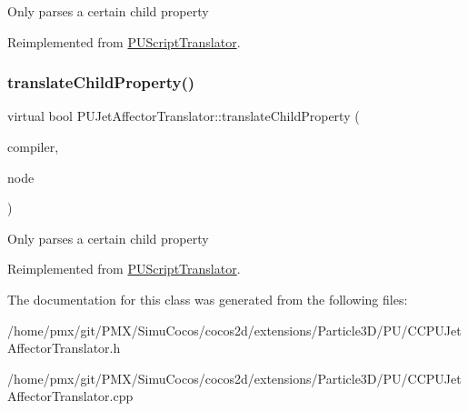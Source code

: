 Only parses a certain child property 

Reimplemented from \hyperlink{classPUScriptTranslator_a0374d83a8a04e57918975d525e0f8fe8}{P\+U\+Script\+Translator}.

\mbox{\label{classPUJetAffectorTranslator_ad9031c782a81a81d75f4dbaa01e88619}} 
\subsubsection{\texorpdfstring{translate\+Child\+Property()}{translateChildProperty()}\hspace{0.1cm}{\footnotesize\ttfamily [2/2]}}
{\footnotesize\ttfamily virtual bool P\+U\+Jet\+Affector\+Translator\+::translate\+Child\+Property (\begin{DoxyParamCaption}\item[{\hyperlink{classPUScriptCompiler}{P\+U\+Script\+Compiler} $\ast$}]{compiler,  }\item[{\hyperlink{classPUAbstractNode}{P\+U\+Abstract\+Node} $\ast$}]{node }\end{DoxyParamCaption})\hspace{0.3cm}{\ttfamily [virtual]}}

Only parses a certain child property 

Reimplemented from \hyperlink{classPUScriptTranslator_a0374d83a8a04e57918975d525e0f8fe8}{P\+U\+Script\+Translator}.



The documentation for this class was generated from the following files\+:\begin{DoxyCompactItemize}
\item 
/home/pmx/git/\+P\+M\+X/\+Simu\+Cocos/cocos2d/extensions/\+Particle3\+D/\+P\+U/C\+C\+P\+U\+Jet\+Affector\+Translator.\+h\item 
/home/pmx/git/\+P\+M\+X/\+Simu\+Cocos/cocos2d/extensions/\+Particle3\+D/\+P\+U/C\+C\+P\+U\+Jet\+Affector\+Translator.\+cpp\end{DoxyCompactItemize}
